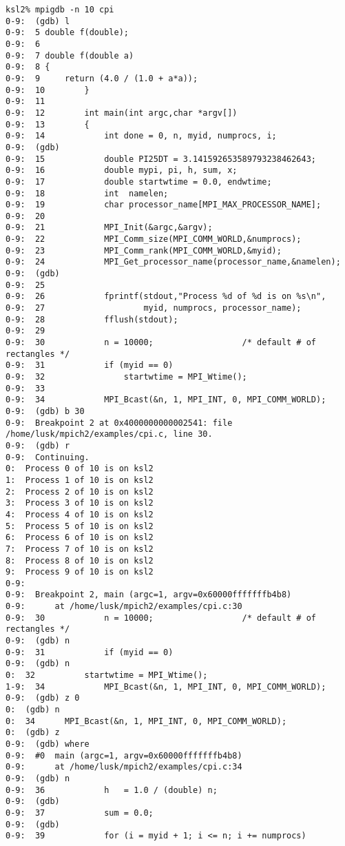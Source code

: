 \documentclass[dvipdfm,11pt]{article}
\begin{document}
\begin{small}
\begin{verbatim}
ksl2% mpigdb -n 10 cpi
0-9:  (gdb) l
0-9:  5 double f(double);
0-9:  6 
0-9:  7 double f(double a)
0-9:  8 {
0-9:  9     return (4.0 / (1.0 + a*a));
0-9:  10        }
0-9:  11        
0-9:  12        int main(int argc,char *argv[])
0-9:  13        {
0-9:  14            int done = 0, n, myid, numprocs, i;
0-9:  (gdb) 
0-9:  15            double PI25DT = 3.141592653589793238462643;
0-9:  16            double mypi, pi, h, sum, x;
0-9:  17            double startwtime = 0.0, endwtime;
0-9:  18            int  namelen;
0-9:  19            char processor_name[MPI_MAX_PROCESSOR_NAME];
0-9:  20        
0-9:  21            MPI_Init(&argc,&argv);
0-9:  22            MPI_Comm_size(MPI_COMM_WORLD,&numprocs);
0-9:  23            MPI_Comm_rank(MPI_COMM_WORLD,&myid);
0-9:  24            MPI_Get_processor_name(processor_name,&namelen);
0-9:  (gdb) 
0-9:  25        
0-9:  26            fprintf(stdout,"Process %d of %d is on %s\n",
0-9:  27                    myid, numprocs, processor_name);
0-9:  28            fflush(stdout);
0-9:  29        
0-9:  30            n = 10000;                  /* default # of rectangles */
0-9:  31            if (myid == 0)
0-9:  32                startwtime = MPI_Wtime();
0-9:  33        
0-9:  34            MPI_Bcast(&n, 1, MPI_INT, 0, MPI_COMM_WORLD);
0-9:  (gdb) b 30
0-9:  Breakpoint 2 at 0x4000000000002541: file /home/lusk/mpich2/examples/cpi.c, line 30.
0-9:  (gdb) r
0-9:  Continuing.
0:  Process 0 of 10 is on ksl2
1:  Process 1 of 10 is on ksl2
2:  Process 2 of 10 is on ksl2
3:  Process 3 of 10 is on ksl2
4:  Process 4 of 10 is on ksl2
5:  Process 5 of 10 is on ksl2
6:  Process 6 of 10 is on ksl2
7:  Process 7 of 10 is on ksl2
8:  Process 8 of 10 is on ksl2
9:  Process 9 of 10 is on ksl2
0-9:  
0-9:  Breakpoint 2, main (argc=1, argv=0x60000fffffffb4b8)
0-9:      at /home/lusk/mpich2/examples/cpi.c:30
0-9:  30            n = 10000;                  /* default # of rectangles */
0-9:  (gdb) n
0-9:  31            if (myid == 0)
0-9:  (gdb) n
0:  32          startwtime = MPI_Wtime();
1-9:  34            MPI_Bcast(&n, 1, MPI_INT, 0, MPI_COMM_WORLD);
0-9:  (gdb) z 0
0:  (gdb) n
0:  34      MPI_Bcast(&n, 1, MPI_INT, 0, MPI_COMM_WORLD);
0:  (gdb) z
0-9:  (gdb) where
0-9:  #0  main (argc=1, argv=0x60000fffffffb4b8)
0-9:      at /home/lusk/mpich2/examples/cpi.c:34
0-9:  (gdb) n
0-9:  36            h   = 1.0 / (double) n;
0-9:  (gdb) 
0-9:  37            sum = 0.0;
0-9:  (gdb) 
0-9:  39            for (i = myid + 1; i <= n; i += numprocs)

\end{verbatim}
\end{small}
\end{document}
